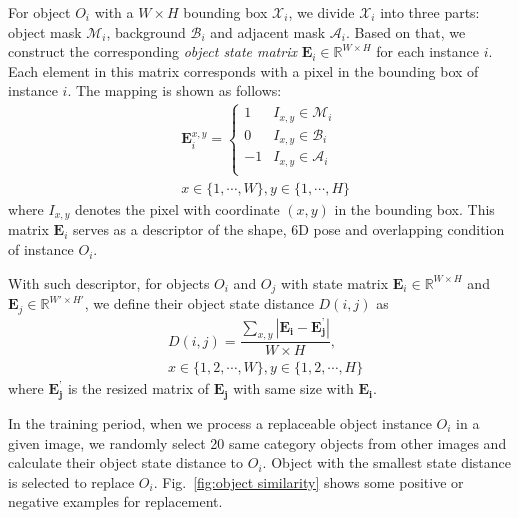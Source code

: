 \documentclass[10pt,twocolumn,letterpaper]{article}
\begin{document}
For object $O_i$ with a $W\times H$ bounding box $\mathcal{X}_i$, we divide $\mathcal{X}_i$ into three parts: object mask $\mathcal{M}_i$, background $\mathcal{B}_i$ and adjacent mask $\mathcal{A}_i$. Based on that, we construct the corresponding \textit{object state matrix} $\textbf{E}_i\in\mathbb{R}^{W\times H}$ for each instance $i$.  Each element in this matrix corresponds with a pixel in the bounding box of instance $i$. The mapping is shown as follows:
\begin{equation}
    \begin{aligned}
        &\textbf{E}_i^{x,y} =
        \begin{cases}
            1 & I_{x,y}\in\mathcal{M}_i\\
            0 & I_{x,y}\in\mathcal{B}_i\\
            -1 & I_{x,y}\in\mathcal{A}_i\\
        \end{cases}\\
        &x\in\{1,\cdots,W\},y\in\{1,\cdots,H\}
    \end{aligned}
    \label{eq:divide region}
\end{equation}
where $I_{x,y}$ denotes the pixel with coordinate $(x,y)$ in the bounding box. This matrix $\textbf{E}_i$ serves as a descriptor of the shape, 6D pose and overlapping condition of instance $O_i$.

With such descriptor, for objects $O_i$ and $O_j$ with state matrix $\textbf{E}_i\in\mathbb{R}^{W\times H}$ and $\textbf{E}_j\in\mathbb{R}^{W'\times H'}$, we define their object state distance $D(i,j)$ as
\begin{equation}
    \begin{aligned}
        &D(i, j)=
        \dfrac{\sum_{x,y}|\mathbf{E_i}-\mathbf{E_j^{’}}|}{W\times H}, \\
        &x\in\{1,2,\cdots,W\},y\in\{1,2,\cdots,H\}
    \end{aligned}
\end{equation}
where $\mathbf{E_j^{’}}$ is the resized matrix of $\mathbf{E_j}$ with same size with $\mathbf{E_i}$.

In the training period, when we process a replaceable object instance $O_i$ in a given image, we randomly select 20 same category objects from other images and calculate their object state distance to $O_i$. Object with the smallest state distance is selected to replace $O_i$. Fig.~\ref{fig:object similarity} shows some positive or negative examples for replacement.
\end{document}
